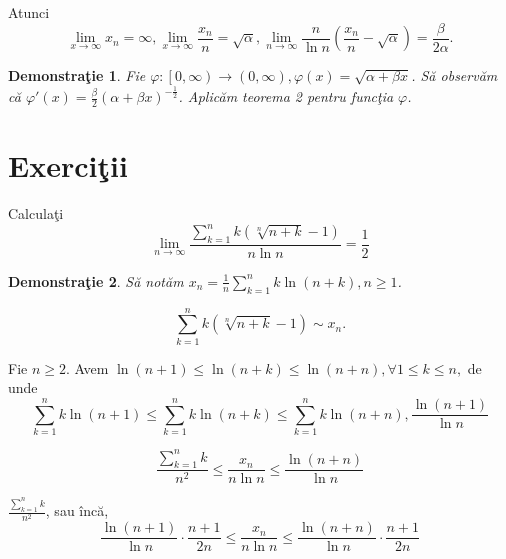 \documentclass[a4paper,12pt,oneside]{report}
\newtheorem{demonstration}{Demonstra\c tie}
\begin{document}
Atunci 
\begin{displaymath}
  \lim_{x \to \infty }x_{n} = \infty , \lim_{x \to \infty }\frac{x_{n}}{n} = \sqrt{\alpha }, \lim_{n \to \infty }\frac{n}{\ln n}\left ( \frac{x_{n}}{n} -\sqrt{\alpha }\right ) = \frac{\beta }{2\alpha }. 
\end{displaymath}


\begin{demonstration}
Fie \(\varphi :\left [ 0,\infty  \right ) \to \left ( 0,\infty  \right ), \varphi \left ( x \right ) = \sqrt{\alpha +\beta x}\). S\u a observ\u am c\u a \({\varphi }'\left ( x \right ) = \frac{\beta }{2}\left ( \alpha +\beta x \right )^{-\frac{1}{2}}\). Aplic\u am teorema 2 pentru func\c tia \(\varphi\). 
\end{demonstration}


\section{Exerci\c tii}

Calcula\c ti \begin{displaymath}
  \lim_{n \to \infty }\frac{\sum_{k=1}^{n}k\left ( \sqrt[n]{n+k} -1\right )}{n\ln n } = \frac{1}{2}
\end{displaymath}


\begin{demonstration}
  S\u a not\u am \(x_{n} = \frac{1}{n}\sum_{k=1}^{n} k \ln \left ( n+k \right ), n \geq 1\). 
\end{demonstration}

\begin{displaymath}
  \sum_{k=1}^{n}k\left ( \sqrt[n]{n+k}-1 \right )\sim x_{n}. \label{eq:5.1} \tag{5.1}
\end{displaymath}

Fie \(n\geq 2\). Avem \(\ln \left ( n+1 \right )\leq \ln \left ( n+k \right )\leq \ln \left ( n+n \right ), \forall 1\leq k\leq n,\) de unde 
\begin{displaymath}
  \sum_{k=1}^{n} k \ln \left ( n+1 \right )\leq \sum_{k=1}^{n}k \ln \left ( n+k \right )\leq \sum_{k=1}^{n} k \ln \left ( n+n \right ), \frac{\ln \left ( n+1 \right )}{\ln n }
\end{displaymath}

\begin{displaymath}
  \frac{\sum_{k=1}^{n}k}{n^{2}}\leq \frac{x_{n}}{n\ln n}\leq \frac{\ln \left ( n+n \right )}{\ln n }
\end{displaymath}

\(\frac{\sum_{k=1}^{n}k}{n^{2}}\), sau \^ inc\u a, 
\begin{displaymath}
  \frac{\ln \left ( n+1 \right )}{\ln n} \cdot \frac{n+1}{2n}\leq \frac{x_{n}}{n\ln n }\leq \frac{\ln \left ( n+n \right )}{\ln n }\cdot \frac{n+1}{2n} \label{eq:5.2} \tag{5.2}
\end{displaymath}
\end{document}
